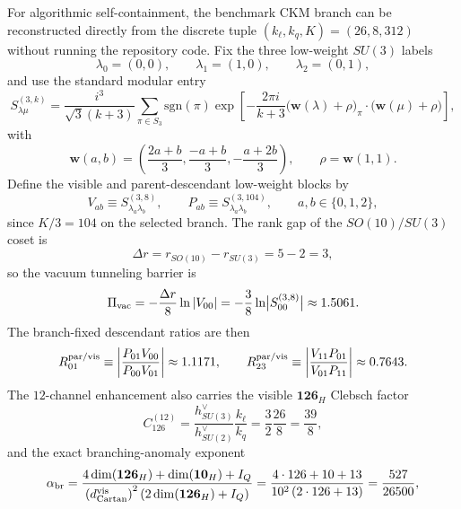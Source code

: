\documentclass[11pt]{article}
\begin{document}
For algorithmic self-containment, the benchmark CKM branch can be reconstructed directly from the discrete tuple $(k_{\ell},k_q,K)=(26,8,312)$ without running the repository code. Fix the three low-weight $SU(3)$ labels
\begin{equation}
 \lambda_0=(0,0),
 \qquad
 \lambda_1=(1,0),
 \qquad
 \lambda_2=(0,1),
\end{equation}
and use the standard modular entry
\begin{equation}
 S^{(3,k)}_{\lambda\mu}
 =
 \frac{i^3}{\sqrt{3}(k+3)}
 \sum_{\pi\in S_3}
 \mathrm{sgn}(\pi)
 \exp\!\left[-\frac{2\pi i}{k+3}\bigl(\mathbf w(\lambda)+\rho\bigr)_{\pi}\cdot\bigl(\mathbf w(\mu)+\rho\bigr)\right],
\end{equation}
with
\begin{equation}
 \mathbf w(a,b)
 =
 \left(
  \frac{2a+b}{3},
  \frac{-a+b}{3},
  -\frac{a+2b}{3}
 \right),
 \qquad
 \rho=\mathbf w(1,1).
\end{equation}
Define the visible and parent-descendant low-weight blocks by
\begin{equation}
 V_{ab}\equiv S^{(3,8)}_{\lambda_a\lambda_b},
 \qquad
 P_{ab}\equiv S^{(3,104)}_{\lambda_a\lambda_b},
 \qquad a,b\in\{0,1,2\},
\end{equation}
since $K/3=104$ on the selected branch. The rank gap of the $SO(10)/SU(3)$ coset is
\begin{equation}
 \Delta r=r_{SO(10)}-r_{SU(3)}=5-2=3,
\end{equation}
so the vacuum tunneling barrier is
\begin{equation}
 \Pi_{\rm vac}
 =
 -\frac{\Delta r}{8}\ln|V_{00}|
 =
 -\frac{3}{8}\ln\bigl|S_{00}^{(3,8)}\bigr|
 \approx 1.5061.
\end{equation}
The branch-fixed descendant ratios are then
\begin{equation}
 R_{01}^{\rm par/vis}
 \equiv
 \left|\frac{P_{01}V_{00}}{P_{00}V_{01}}\right|
 \approx 1.1171,
 \qquad
 R_{23}^{\rm par/vis}
 \equiv
 \left|\frac{V_{11}P_{01}}{V_{01}P_{11}}\right|
 \approx 0.7643.
\end{equation}
The $12$-channel enhancement also carries the visible $\mathbf{126}_H$ Clebsch factor
\begin{equation}
 C_{126}^{(12)}
 =
 \frac{h^{\vee}_{SU(3)}}{h^{\vee}_{SU(2)}}\frac{k_{\ell}}{k_q}
 =
 \frac{3}{2}\frac{26}{8}
 =
 \frac{39}{8},
\end{equation}
and the exact branching-anomaly exponent
\begin{equation}
 \alpha_{\rm br}
 =
 \frac{4\dim(\mathbf{126}_H)+\dim(\mathbf{10}_H)+I_Q}{\left(d_{\rm Cartan}^{\rm vis}\right)^2\left(2\dim(\mathbf{126}_H)+I_Q\right)}
 =
 \frac{4\cdot126+10+13}{10^2\left(2\cdot126+13\right)}
 =
 \frac{527}{26500},
\end{equation}
\end{document}
